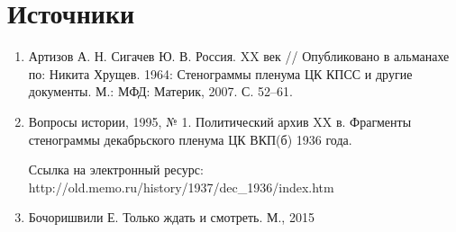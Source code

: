     \chapter{Источники}
      \begin{enumerate}
        \item Артизов А. Н. Сигачев Ю. В. Россия. XX век // Опубликовано в альманахе по: Никита Хрущев. 1964: Стенограммы пленума ЦК КПСС и другие документы. М.: МФД: Материк, 2007. С. 52–61.
        \item Вопросы истории, 1995, № 1. Политический архив XX в. Фрагменты стенограммы декабрьского пленума ЦК ВКП(б) 1936 года.\par Ссылка на электронный ресурс: http://old.memo.ru/history/1937/dec\_1936/index.htm
        \item Бочоришвили Е. Только ждать и смотреть. М., 2015
      \end{enumerate}
      
